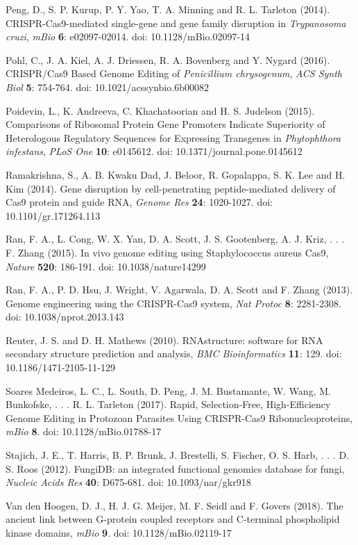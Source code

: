 \documentclass[onecolumn, 11pt,openany]{memoir}
\begin{document}
\begin{multicols}{2}
\begin{sloppy}
\begin{footnotesize}
Peng, D., S. P. Kurup, P. Y. Yao, T. A. Minning and R. L. Tarleton (2014). CRISPR-Cas9-mediated single-gene and gene family disruption in \textit{Trypanosoma cruzi}, \textit{mBio} \textbf{6}: e02097-02014. doi: 10.1128/mBio.02097-14

Pohl, C., J. A. Kiel, A. J. Driessen, R. A. Bovenberg and Y. Nygard (2016). CRISPR/Cas9 Based Genome Editing of \textit{Penicillium chrysogenum}, \textit{ACS Synth Biol} \textbf{5}: 754-764. doi: 10.1021/acssynbio.6b00082

Poidevin, L., K. Andreeva, C. Khachatoorian and H. S. Judelson (2015). Comparisons of Ribosomal Protein Gene Promoters Indicate Superiority of Heterologous Regulatory Sequences for Expressing Transgenes in \textit{Phytophthora infestans}, \textit{PLoS One} \textbf{10}: e0145612. doi: 10.1371/journal.pone.0145612

Ramakrishna, S., A. B. Kwaku Dad, J. Beloor, R. Gopalappa, S. K. Lee and H. Kim (2014). Gene disruption by cell-penetrating peptide-mediated delivery of Cas9 protein and guide RNA, \textit{Genome Res} \textbf{24}: 1020-1027. doi: 10.1101/gr.171264.113

Ran, F. A., L. Cong, W. X. Yan, D. A. Scott, J. S. Gootenberg, A. J. Kriz, . . . F. Zhang (2015). In vivo genome editing using Staphylococcus aureus Cas9, \textit{Nature} \textbf{520}: 186-191. doi: 10.1038/nature14299

Ran, F. A., P. D. Hsu, J. Wright, V. Agarwala, D. A. Scott and F. Zhang (2013). Genome engineering using the CRISPR-Cas9 system, \textit{Nat Protoc} \textbf{8}: 2281-2308. doi: 10.1038/nprot.2013.143

Reuter, J. S. and D. H. Mathews (2010). RNAstructure: software for RNA secondary structure prediction and analysis, \textit{BMC Bioinformatics} \textbf{11}: 129. doi: \mbox{10.1186/1471-2105-11-129}

Soares Medeiros, L. C., L. South, D. Peng, J. M. Bustamante, W. Wang, M. Bunkofske, . . . R. L. Tarleton (2017). Rapid, Selection-Free, High-Efficiency Genome Editing in Protozoan Parasites Using CRISPR-Cas9 Ribonucleoproteins, \textit{mBio} \textbf{8}. doi: 10.1128/mBio.01788-17

Stajich, J. E., T. Harris, B. P. Brunk, J. Brestelli, S. Fischer, O. S. Harb, . . . D. S. Roos (2012). FungiDB: an integrated functional genomics database for fungi, \textit{Nucleic Acids Res} \textbf{40}: D675-681. doi: 10.1093/nar/gkr918

Van den Hoogen, D. J., H. J. G. Meijer, M. F. Seidl and F. Govers (2018). The ancient link between G-protein coupled receptors and C-terminal phospholipid kinase domains, \textit{mBio} \textbf{9}. doi: 10.1128/mBio.02119-17


\end{footnotesize}
\end{sloppy}
\end{multicols}
\end{document}

